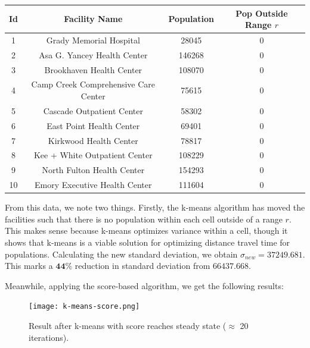\documentclass{article}
\begin{document}
\begin{center}
\begin{tabular}{ | c | c | c | c | }
 \hline
 Id & Facility Name & Population & Pop Outside Range $r$\\
 \hline
 1 & Grady Memorial Hospital & 28045 & 0 \\ 
 2 & Asa G. Yancey Health Center & 146268 & 0 \\  
 3 & Brookhaven Health Center & 108070 & 0 \\
 4 & Camp Creek Comprehensive Care Center & 75615 & 0 \\
 5 & Cascade Outpatient Center & 58302 & 0 \\
 6 & East Point Health Center & 69401 & 0 \\
 7 & Kirkwood Health Center & 78817 & 0 \\
 8 & Kee + White Outpatient Center & 108229 & 0 \\
 9 & North Fulton Health Center & 154293 & 0 \\
 10 & Emory Executive Health Center & 111604 & 0 \\
 \hline
\end{tabular}
\end{center}

From this data, we note two things. Firstly, the k-means algorithm has moved the facilities such that there is no population within each cell outside of a range $r$. This makes sense because k-means optimizes variance within a cell, though it shows that k-means is a viable solution for optimizing distance travel time for populations. Calculating the new standard deviation, we obtain $\sigma_{new} = \mathbf{37249.681}$. This marks a $\mathbf{44\%}$ reduction in standard deviation from $\mathbf{66437.668}$. 

Meanwhile, applying the score-based algorithm, we get the following results:

\begin{figure}[H]
    \centering
    \captionsetup{justification=centering,width=.9\linewidth}
    \captionsetup{justification=centering}
    \texttt{[image: k-means-score.png]}
    \caption{Result after k-means with score reaches steady state ($\approx$ 20 iterations).}
    \label{fig:final-interface}
\end{figure}
\end{document}

